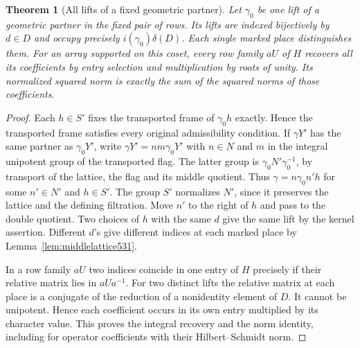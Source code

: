 \documentclass[a4paper,11pt]{article}
\newtheorem{theorem}[proposition]{Theorem}
\theoremstyle{definition}
\theoremstyle{remark}
\numberwithin{equation}{section}
\begin{document}
\begin{theorem}[All lifts of a fixed geometric partner]
\leavevmode\label{thm:partnerlifts531}
Let \(\gamma_0\) be one lift of a geometric partner in the fixed
pair of rows. Its lifts are indexed bijectively by \(d\in D\)
and occupy precisely \(i(\gamma_0)\delta(D)\). Each single marked
place distinguishes them. For an array supported on this coset,
every row family \(aU\) of \(H\) recovers all its coefficients by
entry selection and multiplication by roots of unity. Its
normalized squared norm is exactly the sum of the squared norms
of those coefficients.
\end{theorem}
\begin{proof}
Each \(h\in S'\) fixes the transported frame of \(\gamma_0 h\)
exactly. Hence the transported frame satisfies every original
admissibility condition. If \(\gamma Y'\) has the same partner
as \(\gamma_0Y'\), write
\(\gamma Y'=n m\gamma_0Y'\) with \(n\in N\) and \(m\) in the
integral unipotent group of the transported flag. The latter
group is \(\gamma_0N'\gamma_0^{-1}\), by transport of the
lattice, the flag and its middle quotient. Thus
\(\gamma=n\gamma_0 n'h\) for some \(n'\in N'\) and \(h\in S'\).
The group \(S'\) normalizes \(N'\), since it preserves the
lattice and the defining filtration. Move \(n'\) to the right
of \(h\) and pass to the double quotient. Two choices of \(h\)
with the same \(d\) give the same lift by the kernel assertion.
Different \(d\)'s give different indices at each marked place
by Lemma~\ref{lem:middlelattice531}.

In a row family \(aU\) two indices coincide in one entry of
\(H\) precisely if their relative matrix lies in \(aUa^{-1}\).
For two distinct lifts the relative matrix at each place is a
conjugate of the reduction of a nonidentity element of \(D\).
It cannot be unipotent. Hence each coefficient occurs in its own
entry multiplied by its character value. This proves the integral
recovery and the norm identity, including for operator coefficients
with their Hilbert--Schmidt norm.
\end{proof}
\end{document}
